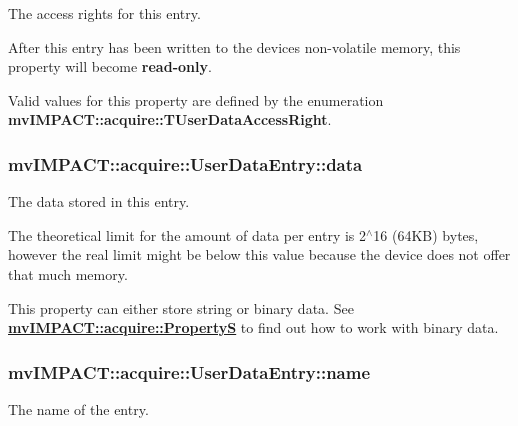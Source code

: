 The access rights for this entry. 

After this entry has been written to the devices non-\/volatile memory, this property will become {\bfseries read-\/only}.

Valid values for this property are defined by the enumeration {\bfseries mv\+I\+M\+P\+A\+C\+T\+::acquire\+::\+T\+User\+Data\+Access\+Right}. \hypertarget{classmv_i_m_p_a_c_t_1_1acquire_1_1_user_data_entry_a3dfca06b8c8b7368fd36382ddf95ac46}{
\subsubsection[{data}]{ mv\+I\+M\+P\+A\+C\+T\+::acquire\+::\+User\+Data\+Entry\+::data}}\label{classmv_i_m_p_a_c_t_1_1acquire_1_1_user_data_entry_a3dfca06b8c8b7368fd36382ddf95ac46}


The data stored in this entry. 

The theoretical limit for the amount of data per entry is 2$^\wedge$16 (64\+K\+B) bytes, however the real limit might be below this value because the device does not offer that much memory.

This property can either store string or binary data. See {\bfseries \hyperlink{classmv_i_m_p_a_c_t_1_1acquire_1_1_property_s}{mv\+I\+M\+P\+A\+C\+T\+::acquire\+::\+Property\+S}} to find out how to work with binary data. \hypertarget{classmv_i_m_p_a_c_t_1_1acquire_1_1_user_data_entry_aa0eccb56a941b1237924d95f61460a21}{
\subsubsection[{name}]{ mv\+I\+M\+P\+A\+C\+T\+::acquire\+::\+User\+Data\+Entry\+::name}}\label{classmv_i_m_p_a_c_t_1_1acquire_1_1_user_data_entry_aa0eccb56a941b1237924d95f61460a21}


The name of the entry. 

